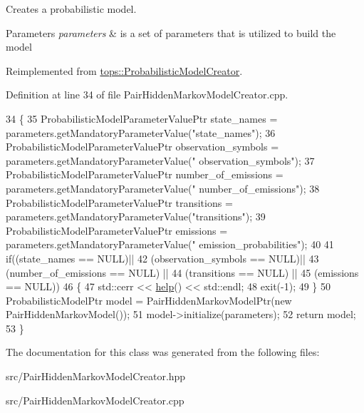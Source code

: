 Creates a probabilistic model. 


\begin{DoxyParams}{Parameters}
{\em parameters} & is a set of parameters that is utilized to build the model \\
\hline
\end{DoxyParams}


Reimplemented from \hyperlink{classtops_1_1ProbabilisticModelCreator_afed6c8ffa45fff446bdaa8b533da8f7c}{tops\+::\+Probabilistic\+Model\+Creator}.



Definition at line 34 of file Pair\+Hidden\+Markov\+Model\+Creator.\+cpp.


\begin{DoxyCode}
34                                                                                                            
       \{
35     ProbabilisticModelParameterValuePtr state\_names = parameters.getMandatoryParameterValue(\textcolor{stringliteral}{"state\_names"});
36     ProbabilisticModelParameterValuePtr observation\_symbols = parameters.getMandatoryParameterValue(\textcolor{stringliteral}{"
      observation\_symbols"});
37     ProbabilisticModelParameterValuePtr number\_of\_emissions = parameters.getMandatoryParameterValue(\textcolor{stringliteral}{"
      number\_of\_emissions"});
38     ProbabilisticModelParameterValuePtr transitions = parameters.getMandatoryParameterValue(\textcolor{stringliteral}{"transitions"});
39     ProbabilisticModelParameterValuePtr emissions = parameters.getMandatoryParameterValue(\textcolor{stringliteral}{"
      emission\_probabilities"});
40 
41     \textcolor{keywordflow}{if}((state\_names == NULL)||
42        (observation\_symbols == NULL)||
43        (number\_of\_emissions == NULL) ||
44        (transitions == NULL) ||
45        (emissions == NULL))
46       \{
47         std::cerr << \hyperlink{classtops_1_1PairHiddenMarkovModelCreator_affd03df40a34c7b04d17e952c07b2e29}{help}() << std::endl;
48     exit(-1);
49       \}
50     ProbabilisticModelPtr model = PairHiddenMarkovModelPtr(\textcolor{keyword}{new} PairHiddenMarkovModel());
51     model->initialize(parameters);
52     \textcolor{keywordflow}{return} model;
53   \}
\end{DoxyCode}


The documentation for this class was generated from the following files\+:\begin{DoxyCompactItemize}
\item 
src/Pair\+Hidden\+Markov\+Model\+Creator.\+hpp\item 
src/Pair\+Hidden\+Markov\+Model\+Creator.\+cpp\end{DoxyCompactItemize}
